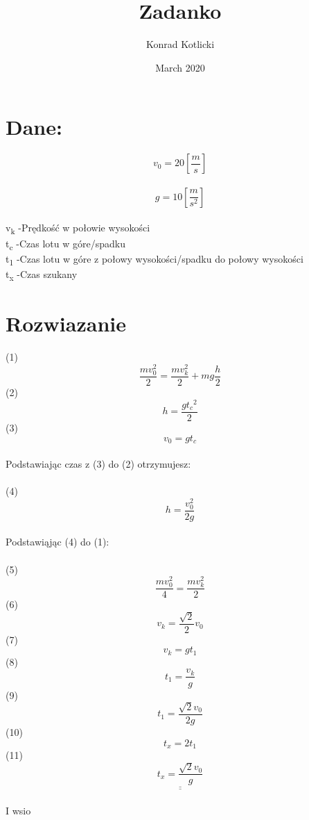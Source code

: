 \documentclass{article}
\title{Zadanko}
\author{Konrad Kotlicki }
\date{March 2020}
\begin{document}
\maketitle

\section{Dane:}
\[v_0=20 [\frac{m}{s}]\]\\
\[g=10 [\frac{m}{s^2}]\]\\
v\textsubscript{k} -Prędkość w połowie wysokości\\
t\textsubscript{c} -Czas lotu w góre/spadku\\
t\textsubscript{1} -Czas lotu w góre z połowy wysokości/spadku do połowy wysokości\\
t\textsubscript{x} -Czas szukany\\

\section{Rozwiazanie}

(1)\[\frac{mv_0^2}{2}=\frac{mv_k^2}{2} + mg\frac{h}{2}\]
(2)\[h=\frac{g{t_c}^2}{2}\]
(3)\[v_0=gt_c\]\\
Podstawiając czas z (3) do (2) otrzymujesz:\\ \\
(4)\[h=\frac{v_0^2}{2g}\]\\
Podstawiąjąc (4) do (1):\\ \\
(5)\[\frac{mv_0^2}{4}=\frac{mv_k^2}{2}\]
(6)\[v_k=\frac{\sqrt{2}}{2}v_0\]
(7)\[v_k=gt_1\]
(8)\[t_1=\frac{v_k}{g}\]
(9)\[t_1=\frac{\sqrt{2}v_0}{2g}\]
(10)\[t_x=2t_1\]
(11)\[\underline{\underline{t_x=\frac{\sqrt{2}v_0}{g}}}\]\\ 

I wsio
\end{document}
